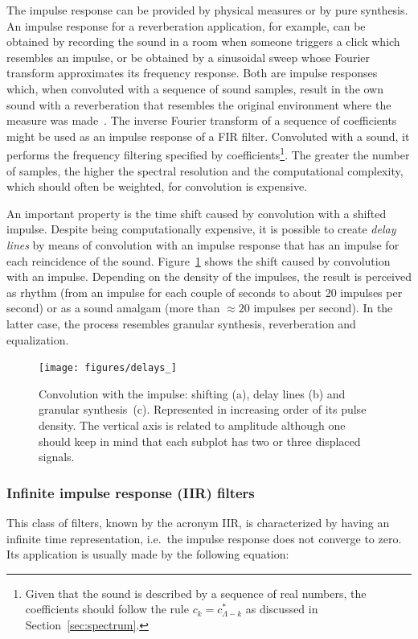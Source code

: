 The impulse response can be provided by physical measures or by pure synthesis. An impulse response for a reverberation application, for example, can be obtained by recording the sound in a room when someone triggers a click which resembles an impulse, or be obtained by a sinusoidal sweep whose Fourier transform approximates its frequency response. Both are impulse responses which, when convoluted with a sequence of sound samples, result in the own sound with a reverberation that resembles the original environment where the measure was made~\cite{Cook}. The inverse Fourier transform of a sequence of coefficients might be used as an impulse response of a FIR filter.
Convoluted with a sound, it performs the frequency filtering specified by coefficients\footnote{Given
that the sound is described by a sequence of real numbers,
the coefficients should follow the rule $c_k=c^*_{\Lambda-k}$ as discussed in Section~\ref{sec:spectrum}.}.
The greater the number of samples, the higher the spectral resolution and the computational complexity, which should often be weighted, for convolution is expensive.

An important property is the time shift caused by convolution with a shifted impulse. Despite being computationally expensive, it is possible to create \emph{delay lines} by means of convolution with an impulse response that has an impulse for each reincidence of the sound. Figure~\ref{fig:delays} shows the shift caused by convolution with an impulse. Depending on the density of the impulses, the result is perceived as rhythm (from an impulse for each couple of seconds to about 20 impulses per second) or as a sound amalgam (more than $\approx 20$ impulses per second). In the latter case, the process resembles granular synthesis, reverberation and equalization.

\begin{figure}
    \centering
        \texttt{[image: figures/delays\_]}
    \caption{Convolution with the impulse: shifting (a), delay lines (b) and granular synthesis~(c). Represented in increasing order of its pulse density. The vertical axis is related to amplitude although one should keep in mind that each subplot has two or three displaced signals.}
        \label{fig:delays}
\end{figure}

\subsubsection{Infinite impulse response (IIR) filters}
This class of filters, known by the acronym IIR, is characterized by having an infinite time representation, i.e.\ the impulse response does not converge to zero. Its application is usually made by the following equation:

